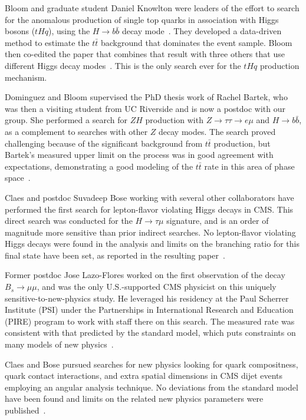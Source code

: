 Bloom and graduate student Daniel Knowlton were leaders of the effort to search for the anomalous production of single top quarks in association with Higgs bosons ($tHq$), using the $H \to b\bar{b}$ decay mode~\cite{bib:tHqbbPAS}. They developed a data-driven method to estimate the $t\bar{t}$ background that dominates the event sample.  Bloom then co-edited the paper that combines that result with three others that use different Higgs decay modes~\cite{bib:tHqpaper}.  This is the only search ever for the $tHq$ production mechanism.

Dominguez and Bloom supervised the PhD thesis work of Rachel Bartek, who was then a visiting student from UC Riverside and is now a postdoc with our group.  She performed a search for $ZH$ production with $Z \to \tau\tau \to e\mu$ and $H \to b{\bar{b}}$, as a complement to searches with other $Z$ decay modes.  The search proved challenging because of the significant background from $t\bar{t}$ production, but Bartek's measured upper limit on the process was in good agreement with expectations, demonstrating a good modeling of the $t\bar{t}$ rate in this area of phase space~\cite{bib:Bartekthesis}.

Claes and postdoc Suvadeep Bose working with several other collaborators have performed the first search for lepton-flavor violating Higgs decays in CMS. This direct search was conducted for the $H\rightarrow \tau\mu$ signature, and is an order of magnitude more sensitive than prior indirect searches. No lepton-flavor violating Higgs decays were found in the analysis and limits on the branching ratio for this final state have been set, as reported in the resulting paper~\cite{bib:higgs-LFV}.

%
%

Former postdoc Jose Lazo-Flores worked on the first observation of the decay $B_s \to \mu\mu$, and was the only U.S.-supported CMS physicist on this uniquely sensitive-to-new-physics study. He leveraged his residency at the Paul Scherrer Institute (PSI) under the Partnerships in International Research and Education (PIRE) program to work with staff there on this search.  The measured rate was consistent with that predicted by the standard model, which puts constraints on many models of new physics~\cite{bib:Bsmumu}.

Claes and Bose pursued searches for new physics looking for quark compositness, quark contact interactions, and extra spatial dimensions in CMS dijet events employing an angular analysis technique. No deviations from the standard model have been found and limits on the related new physics parameters were published~\cite{bib:quark-compositness-etc}.

